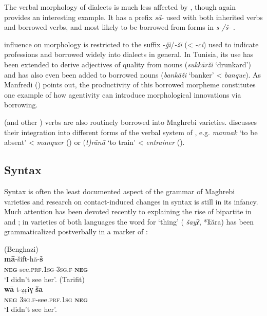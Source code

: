\documentclass[output=paper]{langsci/langscibook}
\begin{document}
  The verbal morphology of  dialects is much less affected by , though  again provides an interesting example. It has a  prefix \textit{sä}- used with both inherited  verbs and borrowed  verbs, and most likely to be borrowed from   forms in \textit{s-/š-} \citep{Taine-Cheikh2008chapter}.

   influence on morphology is restricted to the suffix -\textit{ği}/\textit{{}-ži} (< \textit{{}-ci}) used to indicate professions and borrowed widely into  dialects in general. In Tunisia, its use has been extended to derive adjectives of quality from nouns (\textit{sukkārži} ‘drunkard’) and has also even been added to borrowed  nouns (\textit{bankāži} ‘banker’ <  \textit{banque}). As Manfredi (\citeyear[410]{Manfredi2018}) points out, the productivity of this borrowed  morpheme constitutes one example of how  agentivity can introduce morphological innovations via borrowing.

   (and other ) verbs are also routinely borrowed into Maghrebi varieties. \citet{Talmoudi1986} discusses their integration into different forms of the verbal system of  , e.g. \textit{mannak} `to be absent' <  \textit{manquer} (\citeyear[81--82]{Talmoudi1986}) or (\textit{t)rānā} `to train' <  \textit{entrainer} (\citeyear[21--24]{Talmoudi1986}).

\subsection{ Syntax}

Syntax is often the least documented aspect of the grammar of Maghrebi  varieties and research on contact-induced changes in syntax is still in its infancy. Much attention has been devoted recently to explaining the rise of bipartite  in  and ; in varieties of both languages the word for ‘thing’ ( \textit{šayʔ},  *ḱăra) has been grammaticalized postverbally in a marker of :

\begin{multicols}{2}\raggedcolumns
\begin{exe}
\ex
{} (Benghazi)\\
\gll \textbf{mā}-šift-hā-\textbf{š}\\
     \textbf{\textsc{neg}}-see.\textsc{prf}.\textsc{1sg}-\textsc{3sg.f}-\textbf{\textsc{neg}}\\
\glt `I didn’t see her'.\columnbreak
\ex  {} (Tarifit)\\
\gll \textbf{wā}  t-ẓṛiɣ  \textbf{ša}\\
     \textbf{\textsc{neg}}  \textsc{3sg.f}-see.\textsc{prf}.\textsc{1sg}  \textbf{\textsc{neg}}\\
\glt `I didn’t see her'.
\end{exe}
\end{multicols}
\end{document}
